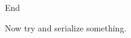 \documentclass[9pt]{beamer}
\theoremstyle{definition}
\begin{document}

\begin{frame}[fragile]{End}
  \begin{center}
    Now try and serialize something.
  \end{center}
\end{frame}

\end{document}
